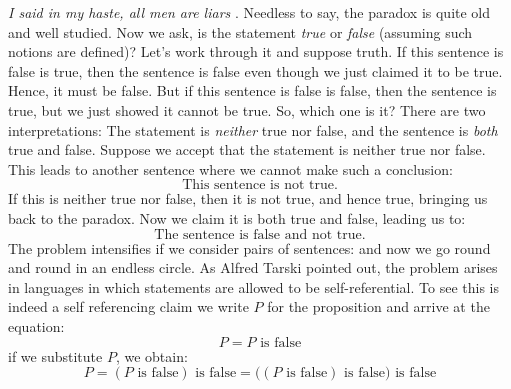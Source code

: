        \textit{I said in my haste, all men are liars} \cite{KingJamesBible}.
        Needless to say, the paradox is quite old and well studied. Now we ask,
        is the statement \textit{true} or \textit{false} (assuming such notions
        are defined)? Let's work through it and suppose truth. If this sentence
        is false is true, then the sentence is false even though we just claimed
        it to be true. Hence, it must be false. But if this sentence is false is
        false, then the sentence is true, but we just showed it cannot be true.
        So, which one is it? There are two interpretations: The statement is
        \textit{neither} true nor false, and the sentence is \textit{both} true
        and false. Suppose we accept that the statement is neither true nor
        false. This leads to another sentence where we cannot make such a
        conclusion:
        \begin{equation}
            \text{This sentence is not true.}
        \end{equation}
        If this is neither true nor false, then it is not true, and hence true,
        bringing us back to the paradox. Now we claim it is both true and false,
        leading us to:
        \begin{equation}
            \text{The sentence is false and not true.}
        \end{equation}
        The problem intensifies if we consider pairs of sentences:
        {%
            \label{eqn:That_Statement_Is_False}%
        }
        and now we go round and round in an endless circle. As Alfred Tarski
        pointed out, the problem arises in languages in which statements are
        allowed to be self-referential. To see this is indeed a self
        referencing claim we write $P$ for the proposition and arrive at the
        equation:
        \begin{equation}
            P=P\text{ is false}
        \end{equation}
        if we substitute $P$, we obtain:
        \begin{equation}
            P=(P\text{ is false})\text{ is false}
             =\big((P\text{ is false})\text{ is false}\big)\text{ is false}
        \end{equation}
